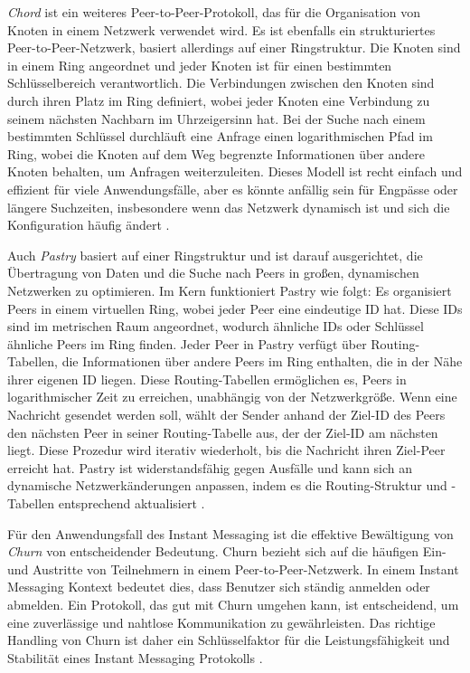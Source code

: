 \textit{Chord} ist ein weiteres Peer-to-Peer-Protokoll, das für die Organisation von Knoten in einem Netzwerk verwendet wird. Es ist ebenfalls ein strukturiertes Peer-to-Peer-Netzwerk, basiert allerdings auf einer Ringstruktur. Die Knoten sind in einem Ring angeordnet und jeder Knoten ist für einen bestimmten Schlüsselbereich verantwortlich. Die Verbindungen zwischen den Knoten sind durch ihren Platz im Ring definiert, wobei jeder Knoten eine Verbindung zu seinem nächsten Nachbarn im Uhrzeigersinn hat. Bei der Suche nach einem bestimmten Schlüssel durchläuft eine Anfrage einen logarithmischen Pfad im Ring, wobei die Knoten auf dem Weg begrenzte Informationen über andere Knoten behalten, um Anfragen weiterzuleiten. Dieses Modell ist recht einfach und effizient für viele Anwendungsfälle, aber es könnte anfällig sein für Engpässe oder längere Suchzeiten, insbesondere wenn das Netzwerk dynamisch ist und sich die Konfiguration häufig ändert \parencite[S. 1-2]{Stoica_Chord}.

Auch \textit{Pastry} basiert auf einer Ringstruktur und ist darauf ausgerichtet, die Übertragung von Daten und die Suche nach Peers in großen, dynamischen Netzwerken zu optimieren. Im Kern funktioniert Pastry wie folgt: Es organisiert Peers in einem virtuellen Ring, wobei jeder Peer eine eindeutige ID hat. Diese IDs sind im metrischen Raum angeordnet, wodurch ähnliche IDs oder Schlüssel ähnliche Peers im Ring finden. Jeder Peer in Pastry verfügt über Routing-Tabellen, die Informationen über andere Peers im Ring enthalten, die in der Nähe ihrer eigenen ID liegen. Diese Routing-Tabellen ermöglichen es, Peers in logarithmischer Zeit zu erreichen, unabhängig von der Netzwerkgröße. Wenn eine Nachricht gesendet werden soll, wählt der Sender anhand der Ziel-ID des Peers den nächsten Peer in seiner Routing-Tabelle aus, der der Ziel-ID am nächsten liegt. Diese Prozedur wird iterativ wiederholt, bis die Nachricht ihren Ziel-Peer erreicht hat. Pastry ist widerstandsfähig gegen Ausfälle und kann sich an dynamische Netzwerkänderungen anpassen, indem es die Routing-Struktur und -Tabellen entsprechend aktualisiert \parencite[S. 331-339]{Rowstron_Pastry}.


Für den Anwendungsfall des Instant Messaging ist die effektive Bewältigung von \textit{Churn} von entscheidender Bedeutung. Churn bezieht sich auf die häufigen Ein- und Austritte von Teilnehmern in einem Peer-to-Peer-Netzwerk. In einem Instant Messaging Kontext bedeutet dies, dass Benutzer sich ständig anmelden oder abmelden. Ein Protokoll, das gut mit Churn umgehen kann, ist entscheidend, um eine zuverlässige und nahtlose Kommunikation zu gewährleisten. Das richtige Handling von Churn ist daher ein Schlüsselfaktor für die Leistungsfähigkeit und Stabilität eines Instant Messaging Protokolls \parencite[S. 316-317]{Peris_KademliaChurn}.

